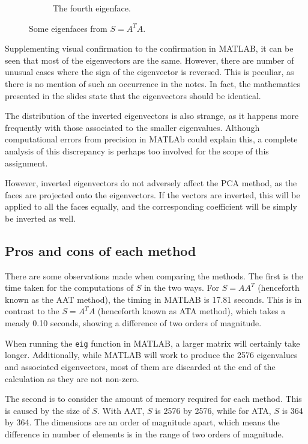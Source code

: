 \documentclass[a4paper, 10pt, conference]{ieeeconf}
\begin{document}
\begin{figure}[ht]
\begin{subfigure}{0.2\textwidth}
                \caption{The fourth eigenface.}
                \label{fig:eigface7}
        \end{subfigure}
	\caption{Some eigenfaces from $S = A^T A$.}
\end{figure}

Supplementing visual confirmation to the confirmation in MATLAB, it can be seen that most of the eigenvectors are the same. However, there are number of unusual cases where the sign of the eigenvector is reversed. This is peculiar, as there is no mention of such an occurrence in the notes. In fact, the mathematics presented in the slides state that the eigenvectors should be identical.

The distribution of the inverted eigenvectors is also strange, as it happens more frequently with those associated to the smaller eigenvalues. Although computational errors from precision in MATLAb could explain this, a complete analysis of this discrepancy is perhaps too involved for the scope of this assignment.

However, inverted eigenvectors do not adversely affect the PCA method, as the faces are projected onto the eigenvectors. If the vectors are inverted, this will be applied to all the faces equally, and the corresponding coefficient will be simply be inverted as well.

\subsection{Pros and cons of each method}
There are some observations made when comparing the methods. The first is the time taken for the computations of $S$ in the two ways. For $S = AA^T$ (henceforth known as the AAT method), the timing in MATLAB is 17.81 seconds. This is in contrast to the $S = A^T A$ (henceforth known as ATA method), which takes a measly 0.10 seconds, showing a difference of two orders of magnitude.

When running the \texttt{eig} function in MATLAB, a larger matrix will certainly take longer. Additionally, while MATLAB will work to produce the 2576 eigenvalues and associated eigenvectors, most of them are discarded at the end of the calculation as they are not non-zero.

The second is to consider the amount of memory required for each method. This is caused by the size of $S$. With AAT, $S$ is 2576 by 2576, while for ATA, $S$ is 364 by 364. The dimensions are an order of magnitude apart, which means the difference in number of elements is in the range of two orders of magnitude.
\end{document}
